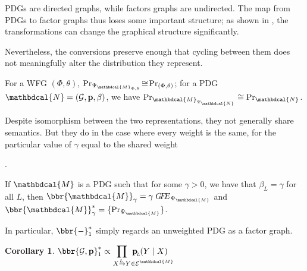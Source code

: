\documentclass[letterpaper]{article} %
\theoremstyle{plain}
\newtheorem{coro}{Corollary}[theorem]
\theoremstyle{definition}
\theoremstyle{remark}
\newcommand{\begthm}[3][]{\begin{#2}[{name=#1},restate=#3,label=#3]}
\newcommand{\attn}[1]{{\color{violet!50!cyan}#1}}
\newcommand\mat[1]{\mathbf{#1}}
\newcommand{\dg}[1]{\mathbdcal{#1}}
\newcommand\GFE{\mathit{G\mkern-4mu F\mkern-4.5mu E}}
\newcommand{\bp}[1][L]{\mat{p}_{\!_{#1}\!}}
\newcommand{\Ed}{\mathcal E}
\newcommand{\Gr}{\mathcal G}
\newcommand{\PDGof}[1]{{\dg M}_{#1}}
\newcommand{\WFGof}[1]{\Psi_{{#1}}}
\newcommand{\ed}[3]{#2
	\overset{\smash{\mskip-5mu\raisebox{-1pt}{$\scriptscriptstyle
				#1$}}}{\rightarrow} #3}
\begin{document}
	PDGs are directed graphs, while factors graphs are undirected. The
	map from PDGs to factor graphs thus loses some important structure;
	as shown in
	,
	the transformations can change the graphical structure significantly.
\attn{
Nevertheless, the conversions
preserve enough that cycling between them does not meaningfully alter the distribution they represent.
\begthm{prop}{prop:fg-pdg-lossless}
	For a WFG $(\Phi,\theta)$, 
	$\Pr_{\WFGof{\PDGof{\Phi,\theta}}} \!\cong\! \Pr_{(\Phi,\theta)}$;
	\def\freshpdgsymbol{{\dg N}}
	for a PDG $\freshpdgsymbol = (\Gr, \mat p, \beta)$, we have $\Pr_{\PDGof{\WFGof{\freshpdgsymbol}}} \cong \Pr_{\freshpdgsymbol}$.
\end{prop}

Despite isomorphism between the two representations,
they not generally share semantics. But they do in the case
where every weight is the same, for the particular value of $\gamma$ equal to the shared weight}. 

\begthm{theorem}{thm:pdg-is-fg}

If $\dg M$ is a PDG such that for some $\gamma >0$, we have that $\beta_L\!
= \gamma$ for all  $L$, then
$\bbr{\dg M}_{\gamma} = \gamma\,\GFE_{ \WFGof{\dg M} }$ and
$\bbr{\dg M}_{\gamma}^* = \{\Pr_{ \WFGof{\dg M}} \}$.

\end{theorem}
\attn{
In particular, 
$\bbr{ - }_1^*$
simply regards an unweighted PDG as a factor graph.
\begin{coro}\label{coro:justafg}
	$\displaystyle\bbr{\Gr, \mat p}_1^* 
\propto \prod_{\ed LXY \mathrlap{\in \Ed^{\dg M}}} \bp(Y \mid X)$
%
\end{coro}
}
\end{document}
